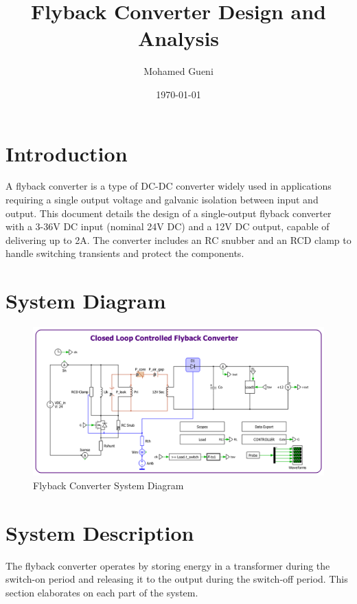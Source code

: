 \documentclass{article}
\begin{document}
\title{Flyback Converter Design and Analysis}
\author{Mohamed Gueni}
\date{\today}
\maketitle
\tableofcontents

\section{Introduction}
A flyback converter is a type of DC-DC converter widely used in applications requiring a single output voltage and galvanic isolation between input and output. This document details the design of a single-output flyback converter with a 3-36V DC input (nominal 24V DC) and a 12V DC output, capable of delivering up to 2A. The converter includes an RC snubber and an RCD clamp to handle switching transients and protect the components.

\section{System Diagram}
\begin{figure}[htbp]
    \centering
    \includegraphics[width=\textwidth]{flyback.jpg}
    \caption{Flyback Converter System Diagram}
    \label{fig:Flyback}
\end{figure}

\section{System Description}
The flyback converter operates by storing energy in a transformer during the switch-on period and releasing it to the output during the switch-off period. This section elaborates on each part of the system.
\end{document}
